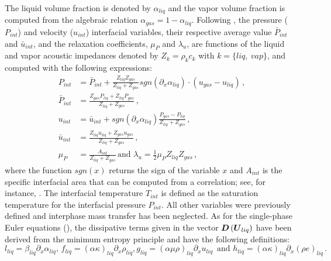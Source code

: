 \documentclass{inputs/mc2015}
\begin{document}
%
The liquid volume fraction is denoted by  $\alpha_{liq}$ and the vapor volume fraction is computed from the algebraic relation $\alpha_{gas} = 1 - \alpha_{liq}$. Following \cite{SEM}, the pressure ($P_{int}$) and velocity ($u_{int}$) interfacial variables, their respective average value $\bar{P}_{int}$ and $\bar{u}_{int}$, and the relaxation coefficients, $\mu_P$ and $\lambda_u$, are functions of the liquid and vapor acoustic impedances denoted by $Z_k = \rho_k c_k$ with $k = \{ liq, \ vap \}$, and computed with the following expressions:
%
\begin{subequations}
\label{eq:int_variables_def}
\begin{align}
  \label{E-R:83}
  P_{int} &= \bar{P}_{int} + \frac{Z_{liq}Z_{gas}}{Z_{liq}+Z_{gas}} sgn \left( \partial_x \alpha_{liq} \right) \cdot (u_{gas}-u_{liq}) \,,
  \\
  \bar{P}_{int} &= \frac{Z_{gas} P_{liq}+Z_{liq}P_{gas}}{Z_{liq}+Z_{gas}} \,,
 \\
  \label{E-R:84}
  u_{int} &= \bar{u}_{int} +  sgn \left( \partial_x \alpha_{liq}\right) \frac{P_{gas}-P_{liq}}{Z_{liq}+Z_{gas}} \,,
  \\
  \bar{u}_{int} &= \frac{Z_{liq} u_{liq}+Z_{gas} u_{gas}}{Z_{liq}+Z_{gas}} \, ,
  \\
  \mu_P &= \frac{A_{int}}{Z_{liq}+Z_{gas}} \, 
  \text{and }
  \lambda_u = \frac{1}{2} \mu_P Z_{liq} Z_{gas} \, ,
\end{align}
\end{subequations}
%
where the function $sgn(x)$ returns the sign of the variable $x$ and $A_{int}$ is the specific interfacial area that can be computed from a correlation; see, for instance, \cite{SEM}. The interfacial temperature $T_{int}$ is defined as the saturation temperature for the interfacial pressure $P_{int}$. All other variables were previously defined and interphase mass transfer has been neglected. As for the single-phase Euler equations (), the dissipative terms given in the vector $\boldsymbol D\left( \boldsymbol U_{liq} \right)$ have been derived from the minimum entropy principle and have the following definitions:
%
\begin{subequations}
\begin{equation}
l_{liq} = \beta_{liq} \partial_x \alpha_{liq} , \, f_{liq}= ( \alpha \kappa )_{liq} \partial_x \rho_{liq} , 
\end{equation}
\begin{equation}
 g_{liq} = ( \alpha \mu \rho )_{liq} \partial_x u_{liq} \, \text{ and } h_{liq} = ( \alpha \kappa )_{liq} \partial_x \left( \rho e \right)_{liq} \, . 
\end{equation}
\end{subequations}
\end{document}
